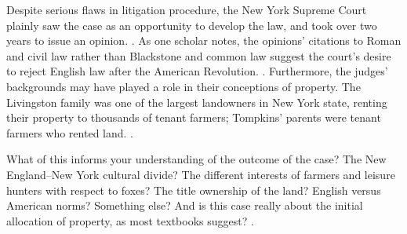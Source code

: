 Despite serious flaws in litigation procedure, the New York Supreme Court
plainly saw the case as an opportunity to develop the law, and took over
two years to issue an opinion. . As one
scholar notes, the opinions' citations to Roman and civil law rather than
Blackstone and common law suggest the court's desire to reject English law
after the American Revolution. . Furthermore,
the judges' backgrounds may have played a role in their conceptions of property.
The Livingston family was one of the largest landowners in New York state,
renting their property to thousands of tenant farmers; Tompkins' parents were
tenant farmers who rented land. .

What of this informs your understanding of the outcome of the case? The New
England--New York cultural divide? The different interests of farmers and
leisure hunters with respect to foxes? The title ownership of the land? English
versus American norms? Something else? And is this case really about the initial
allocation of property, as most textbooks suggest? .
